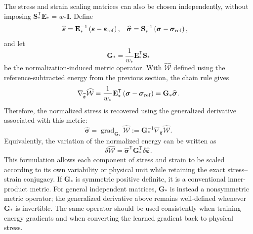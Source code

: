 \documentclass[11pt]{article}
\begin{document}
The stress and strain scaling matrices can also be chosen independently,
without imposing
$\mathbf{S}_*^{\mathsf T}\mathbf{E}_*=w_*\mathbf{I}$.  Define
\begin{align}
    \widehat{\boldsymbol{\varepsilon}}
      &=\mathbf{E}_*^{-1}
        \left(\boldsymbol{\varepsilon}
              -\boldsymbol{\varepsilon}_{\rm ref}\right),
    &
    \widehat{\boldsymbol{\sigma}}
      &=\mathbf{S}_*^{-1}
        \left(\boldsymbol{\sigma}
              -\boldsymbol{\sigma}_{\rm ref}\right),
\end{align}
and let
\begin{equation}
    \mathbf{G}_*
      =\frac{1}{w_*}\mathbf{E}_*^{\mathsf T}\mathbf{S}_*
\end{equation}
be the normalization-induced metric operator.  With
$\widehat{\mathcal{W}}$ defined using the reference-subtracted energy from
the previous section, the chain rule gives
\begin{equation}
    \nabla_{\widehat{\boldsymbol{\varepsilon}}}
       \widehat{\mathcal{W}}
    =\frac{1}{w_*}\mathbf{E}_*^{\mathsf T}
       \left(\boldsymbol{\sigma}
             -\boldsymbol{\sigma}_{\rm ref}\right)
    =\mathbf{G}_*\widehat{\boldsymbol{\sigma}}.
\end{equation}
Therefore, the normalized stress is recovered using the generalized
derivative associated with this metric:
\begin{equation}
    \widehat{\boldsymbol{\sigma}}
    =\operatorname{grad}_{\mathbf{G}_*}
       \widehat{\mathcal{W}}
    :=\mathbf{G}_*^{-1}
      \nabla_{\widehat{\boldsymbol{\varepsilon}}}
       \widehat{\mathcal{W}}.
\end{equation}
Equivalently, the variation of the normalized energy can be written as
\begin{equation}
    \delta\widehat{\mathcal{W}}
      =\widehat{\boldsymbol{\sigma}}^{\mathsf T}
       \mathbf{G}_*^{\mathsf T}
       \delta\widehat{\boldsymbol{\varepsilon}}.
\end{equation}
This formulation allows each component of stress and strain to be scaled
according to its own variability or physical unit while retaining the exact
stress--strain conjugacy.  If $\mathbf{G}_*$ is symmetric positive definite,
it is a conventional inner-product metric.  For general independent
matrices, $\mathbf{G}_*$ is instead a nonsymmetric metric operator; the
generalized derivative above remains well-defined whenever $\mathbf{G}_*$ is
invertible.  The same operator should be used consistently when training
energy gradients and when converting the learned gradient back to physical
stress.
\end{document}
